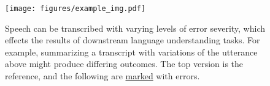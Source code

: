 \begin{figure}[t]
    \centering
    \texttt{[image: figures/example\_img.pdf]}
    \caption{Speech can be transcribed with varying levels of error severity,
    which effects the results of downstream language understanding tasks. For example, summarizing a transcript with variations of the utterance above might produce differing outcomes. The top version is the reference, and the following are \underline{marked} with errors.}
    \label{fig_example}
\end{figure}